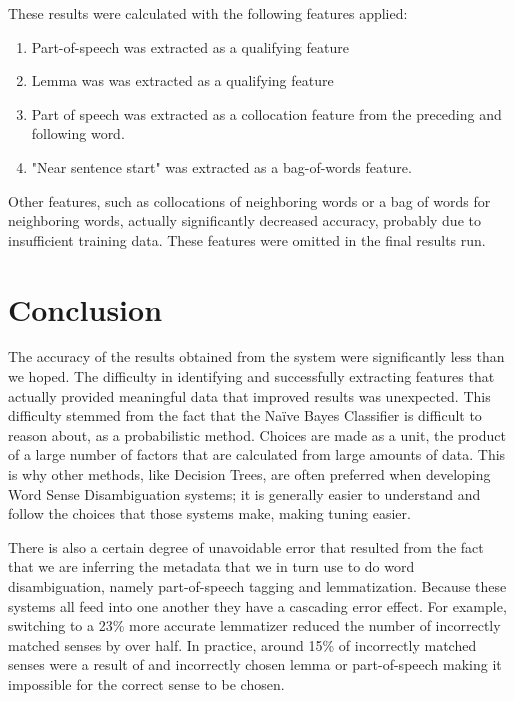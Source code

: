 \documentclass[11pt]{article}
\begin{document}
These results were calculated with the following features applied:

\begin{enumerate}
\itemsep 0em
\item Part-of-speech was extracted as a qualifying feature
\item Lemma was was extracted as a qualifying feature
\item Part of speech was extracted as a collocation feature from the preceding and following word.
\item "Near sentence start" was extracted as a bag-of-words feature.
\end{enumerate}

Other features, such as collocations of neighboring words or a bag of words for neighboring words, actually significantly decreased accuracy, probably due to insufficient training data. These features were omitted in the final results run.

\section{Conclusion}
The accuracy of the results obtained from the system were significantly less than we hoped. The difficulty in identifying and successfully extracting features that actually provided meaningful data that improved results was unexpected. This difficulty stemmed from the fact that the Na\"ive Bayes Classifier is difficult to reason about, as a probabilistic method. Choices are made as a unit, the product of a large number of factors that are calculated from large amounts of data. This is why other methods, like Decision Trees, are often preferred when developing Word Sense Disambiguation systems; it is generally easier to understand and follow the choices that those systems make, making tuning easier.

There is also a certain degree of unavoidable error that resulted from the fact that we are inferring the metadata that we in turn use to do word disambiguation, namely part-of-speech tagging and lemmatization. Because these systems all feed into one another they have a cascading error effect. For example, switching to a 23\% more accurate lemmatizer reduced the number of incorrectly matched senses by over half. In practice, around 15\% of incorrectly matched senses were a result of and incorrectly chosen lemma or part-of-speech making it impossible for the correct sense to be chosen.
\end{document}
